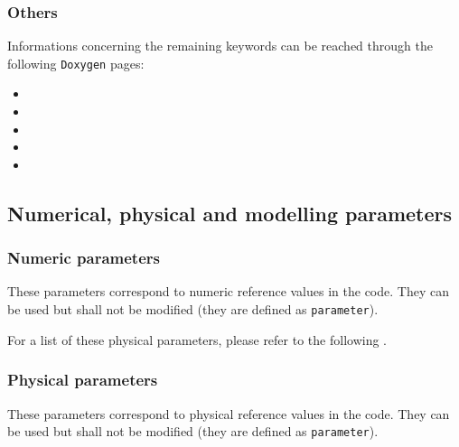 \subsubsection{Others}

Informations concerning the remaining keywords can be reached
through the following \texttt{Doxygen} pages:

\begin{itemize}
\item {}
\item {}
\item {}
\item {}
\item {}
\end{itemize}

\subsection{Numerical, physical and modelling parameters}
\subsubsection{Numeric parameters}

These parameters correspond to numeric reference values in the code.
They can be used but shall not be modified (they are defined as \texttt{parameter}).

For a list of these physical parameters, please refer to the following
.


\subsubsection{Physical parameters}

These parameters correspond to physical reference values in the code. They
can be used but shall not be modified (they are defined as {\tt parameter}).

